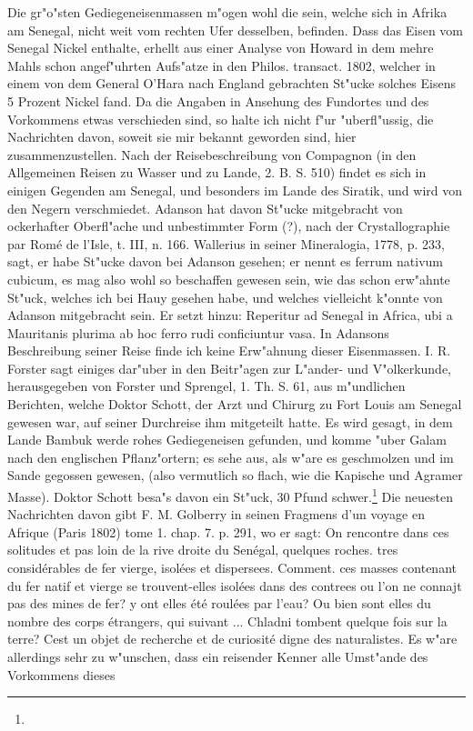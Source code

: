 \documentclass[a4paper, 11pt, oneside, polutonikogreek, german]{article}
\begin{document}
Die gr"o"sten Gediegeneisenmassen m"ogen wohl die sein, welche sich in Afrika am Senegal, nicht weit vom rechten Ufer desselben, befinden. Dass das Eisen vom Senegal Nickel enthalte, erhellt aus einer Analyse von Howard in dem mehre Mahls schon angef"uhrten Aufs"atze in den Philos. transact. 1802, welcher in einem von dem General O'Hara nach England gebrachten St"ucke solches Eisens 5 Prozent Nickel fand. Da die Angaben in Ansehung des Fundortes und des Vorkommens etwas verschieden sind, so halte ich nicht f"ur "uberfl"ussig, die Nachrichten davon, soweit sie mir bekannt geworden sind, hier zusammenzustellen. Nach der Reisebeschreibung von Compagnon (in den Allgemeinen Reisen zu Wasser und zu Lande, 2. B. S. 510) findet es sich in einigen Gegenden am Senegal, und besonders im Lande des Siratik, und wird von den Negern verschmiedet. Adanson hat davon St"ucke mitgebracht von ockerhafter Oberfl"ache und unbestimmter Form (?), nach der Crystallographie par Romé de l'Isle, t. III, n. 166. Wallerius in seiner Mineralogia, 1778, p. 233, sagt, er habe St"ucke davon bei Adanson gesehen; er nennt es ferrum nativum cubicum, es mag also wohl so beschaffen gewesen sein, wie das schon erw"ahnte St"uck, welches ich bei Hauy gesehen habe, und welches vielleicht k"onnte von Adanson mitgebracht sein. Er setzt hinzu: Reperitur ad Senegal in Africa, ubi a Mauritanis plurima ab hoc ferro rudi conficiuntur vasa. In Adansons Beschreibung seiner Reise finde ich keine Erw"ahnung dieser Eisenmassen. I. R. Forster sagt einiges dar"uber in den Beitr"agen zur L"ander- und V"olkerkunde, herausgegeben von Forster und Sprengel, 1. Th. S. 61, aus m"undlichen Berichten, welche Doktor Schott, der Arzt und Chirurg zu Fort Louis am Senegal gewesen war, auf seiner Durchreise ihm mitgeteilt hatte. Es wird gesagt, in dem Lande Bambuk werde rohes Gediegeneisen gefunden, und komme "uber Galam nach den englischen Pflanz"ortern; es sehe aus, als w"are es geschmolzen und im Sande gegossen gewesen, (also vermutlich so flach, wie die Kapische und Agramer Masse). Doktor Schott besa"s davon ein St"uck, 30 Pfund schwer.\footnote{} Die neuesten Nachrichten davon gibt F. M. Golberry in seinen Fragmens d'un voyage en Afrique (Paris 1802) tome 1. chap. 7. p. 291, wo er sagt: On rencontre dans ces solitudes et pas loin de la rive droite du Senégal, quelques roches. tres considérables de fer vierge, isolées et dispersees. Comment. ces masses contenant du fer natif et vierge se trouvent-elles isolées dans des contrees ou l'on ne connajt pas des mines de fer? y ont elles été roulées par l'eau? Ou bien sont elles du nombre des corps étrangers, qui suivant ... Chladni tombent quelque fois sur la terre? Cest un objet de recherche et de curiosité digne des naturalistes. Es w"are allerdings sehr zu w"unschen, dass ein reisender Kenner alle Umst"ande des Vorkommens dieses 
\end{document}
